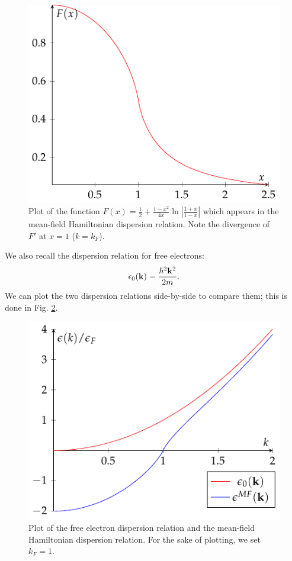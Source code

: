 \begin{figure}[htbp]
    \centering
    \includegraphics[]{Images/fig-Fplot.pdf}
    \caption{Plot of the function $F(x) = \frac{1}{2} + \frac{1-x^2}{4x}\ln\left|\frac{1 + x}{1-x}\right|$ which appears in the mean-field Hamiltonian dispersion relation. Note the divergence of $F'$ at $x = 1$ ($k = k_F$).}
    \label{fig-Fplot}
\end{figure}

We also recall the dispersion relation for free electrons:
\begin{align*}
    \epsilon_0(\mathbf{k}) = \frac{\hbar^2\mathbf{k}^2}{2m}.
\end{align*}
We can plot the two dispersion relations side-by-side to compare them; this is done in Fig. \ref{fig-MFdispersionplot}.

\begin{figure}[htbp]
    \centering
    \includegraphics[]{Images/fig-MFdispersionplot.pdf}

    \caption{Plot of the free electron dispersion relation and the mean-field Hamiltonian dispersion relation. For the sake of plotting, we set $k_F =  1$.}
    \label{fig-MFdispersionplot}
\end{figure}

